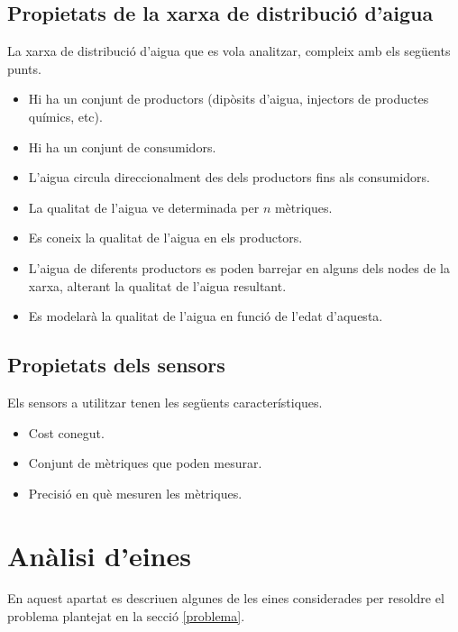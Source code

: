 \documentclass[12pt]{article}
\begin{document}
\subsection{Propietats de la xarxa de distribució d'aigua}
La xarxa de distribució d'aigua que es vola analitzar, compleix amb els següents punts.
\begin{itemize}
	\item Hi ha un conjunt de productors (dipòsits d'aigua, injectors de productes químics, etc).
	\item Hi ha un conjunt de consumidors.
	\item L'aigua circula direccionalment des dels productors fins als consumidors.
	\item La qualitat de l'aigua ve determinada per $n$ mètriques.
	\item Es coneix la qualitat de l'aigua en els productors.
	\item L'aigua de diferents productors es poden barrejar en alguns dels nodes de la xarxa, alterant la qualitat de l'aigua resultant. 
	\item Es modelarà la qualitat de l'aigua en funció de l'edat d'aquesta.
\end{itemize}

\subsection{Propietats dels sensors}
Els sensors a utilitzar tenen les següents característiques.
\begin{itemize}
	\item Cost conegut.
	\item Conjunt de mètriques que poden mesurar.
	\item Precisió en què mesuren les mètriques.
\end{itemize}


\clearpage
\section{Anàlisi d'eines}
En aquest apartat es descriuen algunes de les eines considerades per resoldre el problema plantejat en la secció \ref{problema}.
\end{document}

